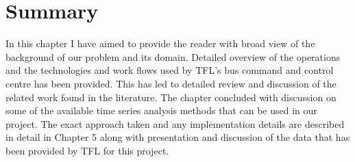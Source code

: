 \section{Summary}
In this chapter I have aimed to provide the reader with broad view of the background of our problem and its domain. Detailed overview of the operations and the technologies and work flows used by TFL's bus command and control centre has been provided. This has led to detailed review and discussion of the related work found in the literature. The chapter concluded with discussion on some of the available time series analysis methods that can be used in our project. The exact approach taken and any implementation details are described in detail in Chapter 5 along with presentation and discussion of the data that has been provided by TFL for this project.